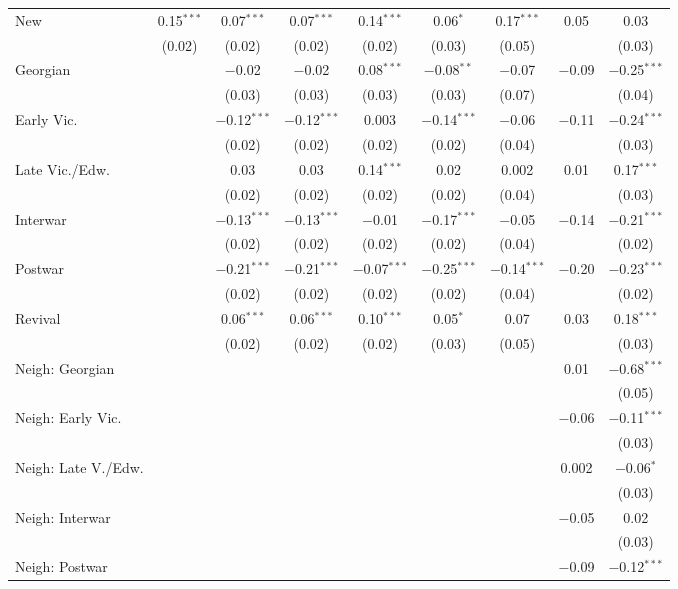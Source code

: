\begin{table}[!htbp]
\begin{tabular}{@{\extracolsep{5pt}}lcccccccc}
  New & 0.15$^{***}$ & 0.07$^{***}$ & 0.07$^{***}$ & 0.14$^{***}$ & 0.06$^{*}$ & 0.17$^{***}$ & 0.05 & 0.03 \\ 
  & (0.02) & (0.02) & (0.02) & (0.02) & (0.03) & (0.05) &  & (0.03) \\ 
  Georgian &  & $-$0.02 & $-$0.02 & 0.08$^{***}$ & $-$0.08$^{**}$ & $-$0.07 & $-$0.09 & $-$0.25$^{***}$ \\ 
  &  & (0.03) & (0.03) & (0.03) & (0.03) & (0.07) &  & (0.04) \\ 
  Early Vic. &  & $-$0.12$^{***}$ & $-$0.12$^{***}$ & 0.003 & $-$0.14$^{***}$ & $-$0.06 & $-$0.11 & $-$0.24$^{***}$ \\ 
  &  & (0.02) & (0.02) & (0.02) & (0.02) & (0.04) &  & (0.03) \\ 
  Late Vic./Edw. &  & 0.03 & 0.03 & 0.14$^{***}$ & 0.02 & 0.002 & 0.01 & 0.17$^{***}$ \\ 
  &  & (0.02) & (0.02) & (0.02) & (0.02) & (0.04) &  & (0.03) \\ 
  Interwar &  & $-$0.13$^{***}$ & $-$0.13$^{***}$ & $-$0.01 & $-$0.17$^{***}$ & $-$0.05 & $-$0.14 & $-$0.21$^{***}$ \\ 
  &  & (0.02) & (0.02) & (0.02) & (0.02) & (0.04) &  & (0.02) \\ 
  Postwar &  & $-$0.21$^{***}$ & $-$0.21$^{***}$ & $-$0.07$^{***}$ & $-$0.25$^{***}$ & $-$0.14$^{***}$ & $-$0.20 & $-$0.23$^{***}$ \\ 
  &  & (0.02) & (0.02) & (0.02) & (0.02) & (0.04) &  & (0.02) \\ 
  Revival &  & 0.06$^{***}$ & 0.06$^{***}$ & 0.10$^{***}$ & 0.05$^{*}$ & 0.07 & 0.03 & 0.18$^{***}$ \\ 
  &  & (0.02) & (0.02) & (0.02) & (0.03) & (0.05) &  & (0.03) \\ 
  Neigh: Georgian &  &  &  &  &  &  & 0.01 & $-$0.68$^{***}$ \\ 
  &  &  &  &  &  &  &  & (0.05) \\ 
  Neigh: Early Vic. &  &  &  &  &  &  & $-$0.06 & $-$0.11$^{***}$ \\ 
  &  &  &  &  &  &  &  & (0.03) \\ 
  Neigh: Late V./Edw. &  &  &  &  &  &  & 0.002 & $-$0.06$^{*}$ \\ 
  &  &  &  &  &  &  &  & (0.03) \\ 
  Neigh: Interwar &  &  &  &  &  &  & $-$0.05 & 0.02 \\ 
  &  &  &  &  &  &  &  & (0.03) \\ 
  Neigh: Postwar &  &  &  &  &  &  & $-$0.09 & $-$0.12$^{***}$ \\ 

\end{tabular}
\end{table}

